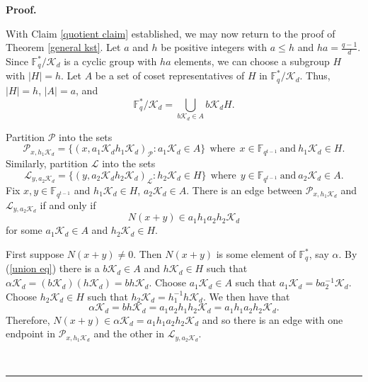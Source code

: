 \documentclass[12pt]{article}%
\newenvironment{proof}[1][Proof]{\noindent\textbf{#1.} }
{\hfill \ \rule{0.5em}{0.5em}}
\begin{document}
\begin{proof}
    \bigskip

    With Claim \ref{quotient claim} established, we may now return to the proof of Theorem \ref{general kst}.
Let $a$ and $h$ be positive integers with $a\leq h$ and 
$ha = \frac{q-1}{d}$.  Since $\mathbb{F}_q^* / \mathcal{K}_d$ is a cyclic group with $ha$ elements, we can choose a subgroup $H$ with $|H| = h$.  Let $A$ be a set of coset representatives of $H$ in $\mathbb{F}_q^* /  \mathcal{K}_d$.  Thus, $|H|=h$, $|A|=a$, and
\begin{equation}\label{union eq}
\mathbb{F}_q^* / \mathcal{K}_d = \bigcup_{b \mathcal{K}_d \in A} b \mathcal{K}_d H.
\end{equation}  

Partition $\mathcal{P}$ into the sets 
\[
\mathcal{P}_{x , h_1 \mathcal{K}_d } = \{ ( x, a_1 \mathcal{K}_d h_1 \mathcal{K}_d )_{ \mathcal{P} } : 
a_1 \mathcal{K}_d \in A \}~~ \mbox{where} ~~ x \in \mathbb{F}_{q^{t-1}} ~\mbox{and}~ h_1 \mathcal{K}_d \in H.
\]
Similarly, partition $\mathcal{L}$ into the sets 
\[
\mathcal{L}_{ y , a_2 \mathcal{K}_d} = \{ ( y , a_2 \mathcal{K}_d h_2 \mathcal{K}_d )_{ \mathcal{L} } : h_2 \mathcal{K}_d \in H \}
~~\mbox{where}~~y \in \mathbb{F}_{q^{t-1}}  ~\mbox{and}~ a_2 \mathcal{K}_d \in A.
\]  
Fix $x,y \in \mathbb{F}_{q^{t-1}}$ and 
$h_1 \mathcal{K}_d \in H$, $a_2 \mathcal{K}_d \in A$.  
There is an edge between 
$\mathcal{P}_{x , h_1\mathcal{K}_d }$ and 
$\mathcal{L}_{ y , a_2 \mathcal{K}_d}$
 if and only if 
\[
N( x + y) \in a_1h_1a_2 h_2 \mathcal{K}_d
\]
for some $a_1 \mathcal{K}_d \in A$ and $h_2 \mathcal{K}_d \in H$.  

First suppose $N(x+y) \neq 0$.  Then $N(x+y)$ is some element 
of $\mathbb{F}_q^*$, say $\alpha$. 
By (\ref{union eq}) there is a $b \mathcal{K}_d \in A$ and $h \mathcal{K}_d \in H$ such that 
$\alpha \mathcal{K}_d = (b \mathcal{K}_d) ( h \mathcal{K}_d) = b h \mathcal{K}_d$.
Choose $a_1 \mathcal{K}_d \in A$ such that 
$a_1 \mathcal{K}_d = ba_2^{-1} \mathcal{K}_d$.
Choose $h_2 \mathcal{K}_d \in H$ such that 
$h_2 \mathcal{K}_d = h_1^{-1} h \mathcal{K}_d$.  We then have that  
\[
\alpha \mathcal{K}_d = bh \mathcal{K}_d =  a_1 a_2 h_1 h_2 \mathcal{K}_d
=
a_1 h_1 a_2 h_2 \mathcal{K}_d.
\]  
Therefore, $N(x +y) \in  \alpha \mathcal{K}_d = a_1 h_1 a_2 h_2 \mathcal{K}_d$ and so there is an edge with one endpoint in $\mathcal{P}_{x,h_1 \mathcal{K}_d}$ and the other in $\mathcal{L}_{y,a_2 \mathcal{K}_d}$.  


\end{proof}
\end{document}
